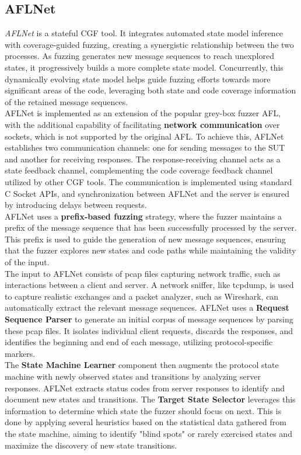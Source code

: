 \subsection{AFLNet}
\textit{AFLNet} \cite{AFLNet} is a stateful CGF tool. It integrates automated state model inference with coverage-guided fuzzing, creating a synergistic relationship between the two processes. As fuzzing generates new message sequences to reach unexplored states, it progressively builds a more complete state model. Concurrently, this dynamically evolving state model helps guide fuzzing efforts towards more significant areas of the code, leveraging both state and code coverage information of the retained message sequences.
\\AFLNet is implemented as an extension of the popular grey-box fuzzer AFL, with the additional capability of facilitating \textbf{network communication} over sockets, which is not supported by the original AFL. To achieve this, AFLNet establishes two communication channels: one for sending messages to the SUT and another for receiving responses. The response-receiving channel acts as a state feedback channel, complementing the code coverage feedback channel utilized by other CGF tools. The communication is implemented using standard C Socket APIs, and synchronization between AFLNet and the server is ensured by introducing delays between requests.
\\AFLNet uses a \textbf{prefix-based fuzzing} strategy, where the fuzzer maintains a prefix of the message sequence that has been successfully processed by the server. This prefix is used to guide the generation of new message sequences, ensuring that the fuzzer explores new states and code paths while maintaining the validity of the input.
\\The input to AFLNet consists of pcap files capturing network traffic, such as interactions between a client and server. A network sniffer, like tcpdump, is used to capture realistic exchanges and a packet analyzer, such as Wireshark, can automatically extract the relevant message sequences. AFLNet uses a \textbf{Request Sequence Parser} to generate an initial corpus of message sequences by parsing these pcap files. It isolates individual client requests, discards the responses, and identifies the beginning and end of each message, utilizing protocol-specific markers.
\\The \textbf{State Machine Learner} component then augments the protocol state machine with newly observed states and transitions by analyzing server responses. AFLNet extracts status codes from server responses to identify and document new states and transitions. The \textbf{Target State Selector} leverages this information to determine which state the fuzzer should focus on next. This is done by applying several heuristics based on the statistical data gathered from the state machine, aiming to identify "blind spots" or rarely exercised states and maximize the discovery of new state transitions.
